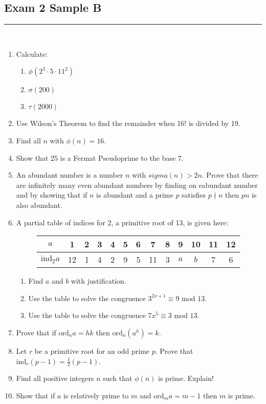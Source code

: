 \documentclass[class=article, crop=false]{standalone}
\def\ord{{\text{ord}}}
\def\ind{{\text{ind}}}
\begin{document}
\subsection*{Exam 2 Sample B}
\rule{\textwidth}{1pt}\\
\begin{enumerate}
	\item Calculate:
	\begin{enumerate}
		\item $\phi(2^3\cdot 5\cdot 11^2)$
		\item $\sigma(200)$
		\item $\tau(2000)$
	\end{enumerate}

	\item Use Wilson's Theorem to find the remainder when 16! is divided by 19.
	
	\item Find all $n$ with $\phi(n)=16$.
	
	\item Show that 25 is a Fermat Pseudoprime to the base 7.
	
	\item An abundant number is a number $n$ with $sigma(n) > 2n$. Prove that there are
	infinitely many even abundant numbers by finding on eabundant number and by showing
	that if $n$ is abundant and a prime $p$ satisfies $p\nmid n$ then $pn$ is also abundant.

	\item A partial table of indices for 2, a primitive root of 13, is given here:
	\begin{figure}[h]
    \centering
    \begin{tabular}{|c|c|c|c|c|c|c|c|c|c|c|c|c|}
      \hline
      $a$ & 1 & 2 & 3 & 4 & 5 & 6 & 7 & 8 & 9 & 10 & 11 & 12 \\
      \hline
      $\ind_2 a$ & 12 & 1 & 4 & 2 & 9 & 5 & 11 & 3 & $a$ & $b$ & 7 & 6 \\
      \hline
    \end{tabular}
    \end{figure}
	\begin{enumerate}
		\item Find $a$ and $b$ with justification.
		\item Use the table to solve the congruence $3^{2x+1}\equiv 9\mbox{ mod } 13$.
		\item Use the table to solve the congruence $7x^5 \equiv 3\mbox{ mod } 13$.
	\end{enumerate}

	\item Prove that if $\ord_n a = hk$ then $\ord_n (a^h)= k$.
	
	\item Let $r$ be a primitive root for an odd prime $p$. Prove that $\ind_r (p-1) = \frac{1}{2}(p-1)$.
	
	\item Find all positive integers $n$ such that $\phi(n)$ is prime. Explain!
	
	\item Show that if $a$ is relatively prime to $m$ and $\ord_m a=m-1$ then $m$ is prime.
\end{enumerate}
\end{document}
